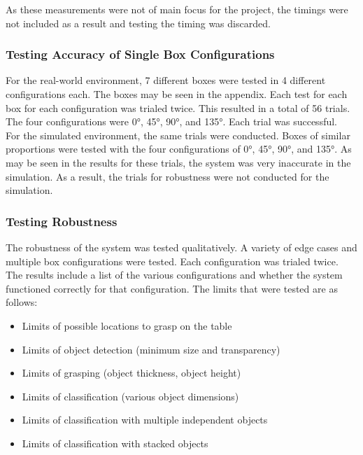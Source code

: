 \documentclass[letterpaper, 10 pt, conference]{conf/ieeeconf}  %
\begin{document}
As these measurements were not of main focus for the project, the timings were not
included as a result and testing the timing was discarded.\\

\subsubsection{Testing Accuracy of Single Box Configurations}
For the real-world environment, 7 different boxes were tested in 4 different
configurations each. The boxes may be seen in the appendix. Each test for each
box for each configuration was trialed twice. This resulted in a total of 56
trials. The four configurations were \ang{0}, \ang{45}, \ang{90}, and \ang{135}.
Each trial was successful.\\

For the simulated environment, the same trials were conducted. Boxes of similar
proportions were tested with the four configurations of \ang{0}, \ang{45},
\ang{90}, and \ang{135}. As may be seen in the results for these trials, the
system was very inaccurate in the simulation. As a result, the trials for
robustness were not conducted for the simulation.\\

\subsubsection{Testing Robustness}
The robustness of the system was tested qualitatively. A variety of edge cases
and multiple box configurations were tested. Each configuration was trialed
twice. The results include a list of the various configurations and whether the
system functioned correctly for that configuration. The limits that were tested
are as follows:

\begin{itemize}
\item Limits of possible locations to grasp on the table
\item Limits of object detection (minimum size and transparency)
\item Limits of grasping (object thickness, object height)
\item Limits of classification (various object dimensions)
\item Limits of classification with multiple independent objects
\item Limits of classification with stacked objects
\end{itemize}
\end{document}
